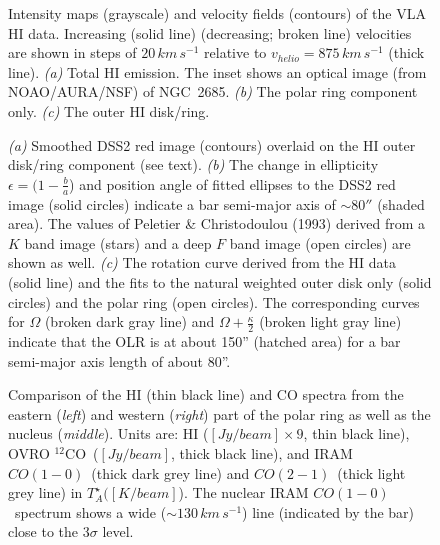 \documentclass{aastex}
\newcommand{\CO}{$^{12}$CO}
\newcommand{\COe}{$CO(1-0)$}
\newcommand{\COz}{$CO(2-1)$}
\newcommand{\kms}{km\,s^{-1}}
\begin{document}
\clearpage

\begin{figure}
\caption{
Intensity maps (grayscale) and velocity fields (contours) of the VLA
HI data. Increasing (solid line) (decreasing; broken line) velocities
are shown in steps of $20\,\kms$ relative to $v_{helio}=875\,\kms$
(thick line). {\it (a)} Total HI emission. The
inset shows an optical image (from NOAO/AURA/NSF) of NGC~2685. {\it
(b)} The polar ring component only. {\it (c)} The outer HI disk/ring.  
}\label{fig:hi}
\end{figure}

\clearpage

\begin{figure}
\caption{
{\it (a)} Smoothed DSS2 red image (contours) overlaid on the HI outer
disk/ring component (see text). {\it (b)} The change in ellipticity
$\epsilon=(1-\frac{b}{a}$) and position angle of fitted ellipses to
the DSS2 red image (solid circles) indicate a bar semi-major axis of
$\sim 80''$ (shaded area). The values of Peletier
\& Christodoulou (1993) derived from a $K$ band image (stars) and a
deep $F$ band image (open circles) are shown as well. {\it (c)} The
rotation curve derived from the HI data (solid line) and the fits to
the natural weighted outer disk only (solid circles) and the polar
ring (open circles). The corresponding curves for
$\Omega$ (broken dark gray line) and $\Omega+\frac{\kappa}{2}$ (broken
light gray line) indicate that the OLR is at about 150'' (hatched
area) for a bar semi-major axis length of about 80''.
\label{fig:dss}}
\end{figure}

\clearpage 

\begin{figure}
\caption{
Comparison of the HI (thin black line) and CO spectra from the eastern
({\it left}) and western ({\it right}) part of the polar ring as well
as the nucleus ({\it middle}). Units are: HI ($[Jy/beam]\times9$, thin
black line), OVRO \CO\ ($[Jy/beam]$, thick black line), and IRAM \COe\
(thick dark grey line) and \COz\ (thick light grey line) in
$T_A^{\star} ([K/beam]$). The nuclear IRAM \COe\ spectrum shows a wide
($\sim 130\,\kms$) line (indicated by the bar) close to the 3$\sigma$
level.
\label{fig:spec}}
\end{figure}
\end{document}
